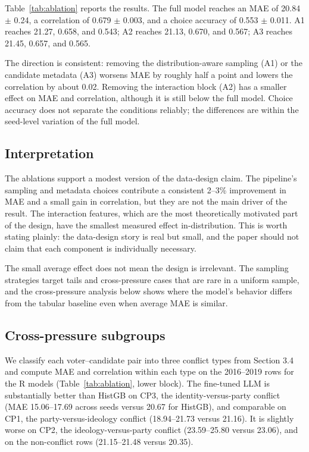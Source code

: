 Table~\ref{tab:ablation} reports the results. The full model reaches an MAE of 20.84
\(\pm\) 0.24, a correlation of 0.679 \(\pm\) 0.003, and a choice
accuracy of 0.553 \(\pm\) 0.011. A1 reaches 21.27, 0.658, and 0.543; A2
reaches 21.13, 0.670, and 0.567; A3 reaches 21.45, 0.657, and 0.565.




The direction is consistent: removing the distribution-aware sampling
(A1) or the candidate metadata (A3) worsens MAE by roughly half a point
and lowers the correlation by about 0.02. Removing the interaction block
(A2) has a smaller effect on MAE and correlation, although it is still
below the full model. Choice accuracy does not separate the conditions
reliably; the differences are within the seed-level variation of the
full model.

\subsection{Interpretation}\label{interpretation-1}

The ablations support a modest version of the data-design claim. The
pipeline's sampling and metadata choices contribute a consistent 2--3\%
improvement in MAE and a small gain in correlation, but they are not the
main driver of the result. The interaction features, which are the most
theoretically motivated part of the design, have the smallest measured
effect in-distribution. This is worth stating plainly: the data-design
story is real but small, and the paper should not claim that each
component is individually necessary.

The small average effect does not mean the design is irrelevant. The
sampling strategies target tails and cross-pressure cases that are rare
in a uniform sample, and the cross-pressure analysis below shows where
the model's behavior differs from the tabular baseline even when average
MAE is similar.

\subsection{Cross-pressure subgroups}\label{cross-pressure-subgroups}

We classify each voter--candidate pair into three conflict types from
Section 3.4 and compute MAE and correlation within each type on the
2016--2019 rows for the R models (Table~\ref{tab:ablation}, lower block). The fine-tuned
LLM is substantially better than HistGB on CP3, the
identity-versus-party conflict (MAE 15.06--17.69 across seeds versus
20.67 for HistGB), and comparable on CP1, the party-versus-ideology
conflict (18.94--21.73 versus 21.16). It is slightly worse on CP2, the
ideology-versus-party conflict (23.59--25.80 versus 23.06), and on the
non-conflict rows (21.15--21.48 versus 20.35).

